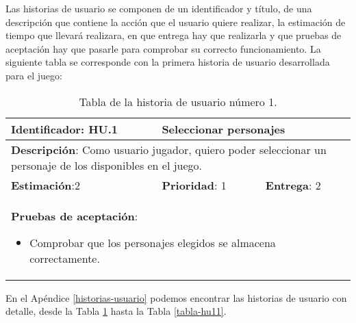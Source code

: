 \newpage

Las historias de usuario se componen de un identificador y título, de una descripción que contiene la acción que el usuario quiere realizar, la estimación de tiempo que llevará realizara, en que entrega hay que realizarla y que pruebas de aceptación hay que pasarle para comprobar su correcto funcionamiento. La siguiente tabla se corresponde con la primera historia de usuario desarrollada para el juego:

\begin{table}[h]
  \begin{center}
    \begin{tabular}{|p{4cm}|p{4cm}|p{4cm}|}

    \hline
    \textbf{Identificador}: HU.1
    & \multicolumn{2}{p{8cm}|}{Seleccionar personajes}\\

    \hline
    \multicolumn{3}{|p{12cm}|}{\textbf{Descripción}: Como usuario jugador, quiero poder seleccionar un personaje de los disponibles en el juego.}\\

    \hline
    \textbf{Estimación}:2
    & \textbf{Prioridad}: 1
    & \textbf{Entrega}: 2\\

    \hline
    \multicolumn{3}{|p{12cm}|}{\textbf{Pruebas de aceptación}:
      \begin{itemize}
        \item Comprobar que los personajes elegidos se almacena correctamente.
      \end{itemize}
    }\\

    \hline

    \end{tabular}

    \caption{Tabla de la historia de usuario número 1.}
    \label{tabla-hu1}

  \end{center}
\end{table}

En el Apéndice \ref{historias-usuario} podemos encontrar las historias de usuario con detalle, desde la Tabla \ref{tabla-hu1} hasta la Tabla \ref{tabla-hu11}.
